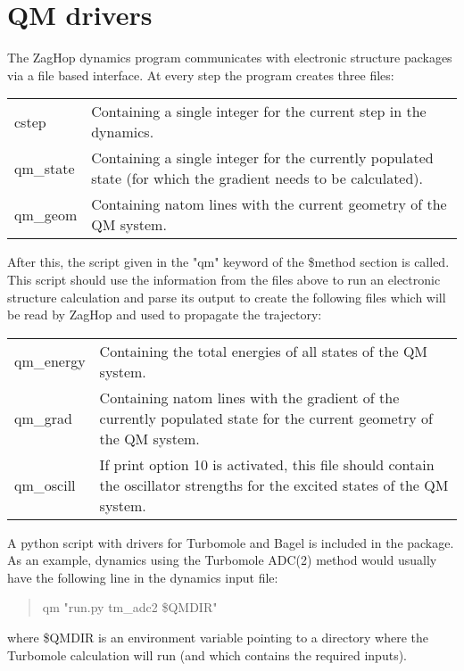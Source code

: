 \documentclass{report}
\begin{document}
\section*{QM drivers}
The ZagHop dynamics program communicates with electronic structure packages via a file based interface. At every step the program creates three files:
\begin{tabularx}{\textwidth}{ m{2.5cm} X }
cstep		& Containing a single integer for the current step in the dynamics. \\
qm\_state	& Containing a single integer for the currently populated state (for which the gradient needs to be calculated). \\
qm\_geom	& Containing natom lines with the current geometry of the QM system.
\end{tabularx}
After this, the script given in the "qm" keyword of the \$method section is called. This script should use the information from the files above to run an electronic structure calculation and parse its output to create the following files which will be read by ZagHop and used to propagate the trajectory:
\begin{tabularx}{\textwidth}{ m{2.5cm} X }
	qm\_energy	& Containing the total energies of all states of the QM system. \\
	qm\_grad	& Containing natom lines with the gradient of the currently populated state for the current geometry of the QM system. \\
	qm\_oscill	& If print option 10 is activated, this file should contain the oscillator strengths for the excited states of the QM system.
\end{tabularx}

A python script with drivers for Turbomole and Bagel is included in the package. As an example, dynamics using the Turbomole ADC(2) method would usually have the following line in the dynamics input file:
\begin{quote}
	qm "run.py tm\_adc2 \$QMDIR"
\end{quote}
where \$QMDIR is an environment variable pointing to a directory where the Turbomole calculation will run (and which contains the required inputs).
\end{document}
